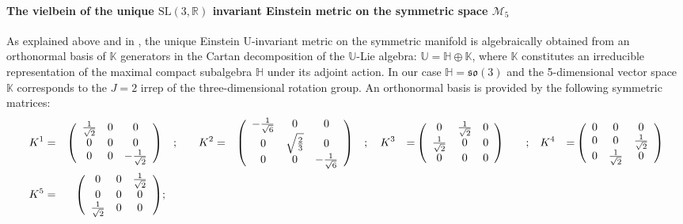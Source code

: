 \documentclass[10pt,a4paper]{article}
\newcommand{\so}{\mathfrak{so}}
\begin{document}
\paragraph{The vielbein of the unique  $\mathrm{SL(3,\mathbb{R})}$ invariant Einstein metric on the symmetric space $\mathcal{M}_5$}
As explained above and in \cite{pgtstheory}, the unique Einstein $\mathrm{U}$-invariant metric on the symmetric manifold is algebraically  obtained from an orthonormal basis of $\mathbb{K}$ generators in the Cartan decomposition of the $\mathbb{U}$-Lie algebra: $\mathbb{U}=\mathbb{H} \oplus \mathbb{K}$, where $\mathbb{K}$ constitutes an irreducible representation of the maximal compact subalgebra $\mathbb{H}$ under its adjoint action. In our case $\mathbb{H} = \so(3)$
and the 5-dimensional vector space $\mathbb{K}$ corresponds to the $J=2$ irrep of the three-dimensional rotation group. An orthonormal basis is provided by the following symmetric matrices:
\begin{alignat}{9}
  K^1 & = & \left(
\begin{array}{ccc}
 \frac{1}{\sqrt{2}} & 0 & 0 \\
 0 & 0 & 0 \\
 0 & 0 & -\frac{1}{\sqrt{2}} \\
\end{array}
\right) & \quad ; \quad &  K^2 & = & \left(
\begin{array}{ccc}
 -\frac{1}{\sqrt{6}} & 0 & 0 \\
 0 & \sqrt{\frac{2}{3}} & 0 \\
 0 & 0 & -\frac{1}{\sqrt{6}} \\
\end{array}
\right) & \quad ; \quad
  K^3 & = & \left(
\begin{array}{ccc}
 0 & \frac{1}{\sqrt{2}} & 0 \\
 \frac{1}{\sqrt{2}} & 0 & 0 \\
 0 & 0 & 0 \\
\end{array}
\right) & \quad ; \quad &  K^4 & = & \left(
\begin{array}{ccc}
 0 & 0 & 0 \\
 0 & 0 & \frac{1}{\sqrt{2}} \\
 0 & \frac{1}{\sqrt{2}} & 0 \\
\end{array}
\right) \nonumber\\
  K^5 & = & \left(
\begin{array}{ccc}
 0 & 0 & \frac{1}{\sqrt{2}} \\
 0 & 0 & 0 \\
 \frac{1}{\sqrt{2}} & 0 & 0 \\
\end{array}
\right) & ; &  \null & \null & \null
\end{alignat}
\end{document}
